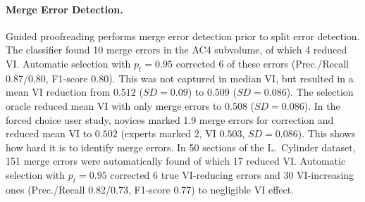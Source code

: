 \paragraph{Merge Error Detection.} Guided proofreading performs merge error detection prior to split error detection. The classifier found 10 merge errors in the AC4 subvolume, of which 4 reduced VI. Automatic selection with $p_t=0.95$ corrected 6 of these errors (Prec./Recall 0.87/0.80, F1-score 0.80). This was not captured in median VI, but resulted in a mean VI reduction from $0.512$ ($SD=0.09$) to $0.509$ ($SD=0.086$). The selection oracle reduced mean VI with only merge errors to $0.508$ ($SD=0.086$). In the forced choice user study, novices marked 1.9 merge errors for correction and reduced mean VI to $0.502$ (experts marked 2, VI $0.503$, $SD=0.086$). This shows how hard it is to identify merge errors. In 50 sections of the L.~Cylinder dataset, 151 merge errors were automatically found of which 17 reduced VI. Automatic selection with $p_t=0.95$ corrected 6 true VI-reducing errors and 30 VI-increasing ones (Prec./Recall 0.82/0.73, F1-score 0.77) to negligible VI effect. 

